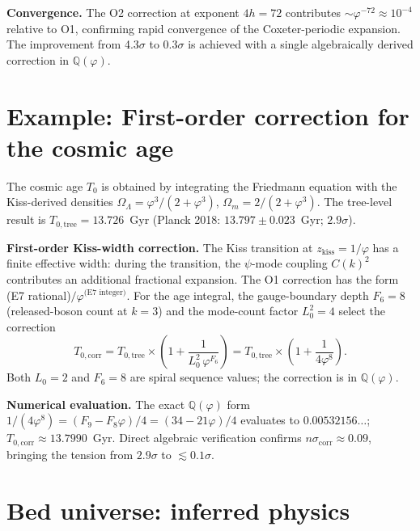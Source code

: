 \documentclass[12pt,a4paper]{article}
\begin{document}
\textbf{Convergence.} The O2 correction at exponent $4h = 72$ contributes $\sim \varphi^{-72} \approx 10^{-4}$ relative to O1, confirming rapid convergence of the Coxeter-periodic expansion. The improvement from 4.3$\sigma$ to 0.3$\sigma$ is achieved with a single algebraically derived correction in $\mathbb{Q}(\varphi)$.


\section{Example: First-order correction for the cosmic age}
\label{sec:app-T0-o1}

The cosmic age $T_0$ is obtained by integrating the Friedmann equation with the Kiss-derived densities $\Omega_\Lambda = \varphi^3/(2+\varphi^3)$, $\Omega_m = 2/(2+\varphi^3)$. The tree-level result is $T_{0,\mathrm{tree}} = 13.726$~Gyr (Planck 2018: $13.797 \pm 0.023$~Gyr; $2.9\sigma$).

\textbf{First-order Kiss-width correction.} The Kiss transition at $z_{\mathrm{kiss}} = 1/\varphi$ has a finite effective width: during the transition, the $\psi$-mode coupling $C(k)^2$ contributes an additional fractional expansion. The O1 correction has the form (E7 rational)$/\varphi^{\text{(E7 integer)}}$. For the age integral, the gauge-boundary depth $F_6 = 8$ (released-boson count at $k=3$) and the mode-count factor $L_0^2 = 4$ select the correction
\begin{equation}
T_{0,\mathrm{corr}} = T_{0,\mathrm{tree}} \times \left(1 + \frac{1}{L_0^2\,\varphi^{F_6}}\right) = T_{0,\mathrm{tree}} \times \left(1 + \frac{1}{4\varphi^8}\right).
\end{equation}
Both $L_0 = 2$ and $F_6 = 8$ are spiral sequence values; the correction is in $\mathbb{Q}(\varphi)$.

\textbf{Numerical evaluation.} The exact $\mathbb{Q}(\varphi)$ form $1/(4\varphi^8) = (F_9 - F_8\varphi)/4 = (34 - 21\varphi)/4$ evaluates to $0.00532156\ldots$; $T_{0,\mathrm{corr}} \approx 13.7990$~Gyr. Direct algebraic verification confirms $n\sigma_{\mathrm{corr}} \approx 0.09$, bringing the tension from $2.9\sigma$ to $\lesssim 0.1\sigma$.


\section{Bed universe: inferred physics}
\label{sec:app-bed-physics}
\end{document}
